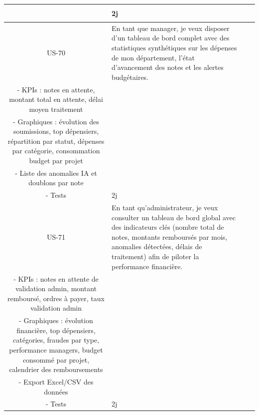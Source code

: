 \documentclass[12pt,a4paper]{report}
\begin{document}
\begin{longtable}{|c|p{5cm}|p{5.5cm}|c|}
\begin{tabular}[t]{@{}p{5.5cm}@{}}
\end{tabular} & 2j \\

\hline

US-70 & En tant que manager, je veux disposer d'un tableau de bord complet avec des statistiques synthétiques sur les dépenses de mon département, l'état d'avancement des notes et les alertes budgétaires. & 

\begin{tabular}[t]{@{}p{5.5cm}@{}}

- Composant \texttt{ManagerDashboard} \\

- KPIs : notes en attente, montant total en attente, délai moyen traitement \\

- Graphiques : évolution des soumissions, top dépensiers, répartition par statut, dépenses par catégorie, consommation budget par projet \\

- Liste des anomalies IA et doublons par note \\

- Tests

\end{tabular} & 2j \\

\hline

US-71 & En tant qu'administrateur, je veux consulter un tableau de bord global avec des indicateurs clés (nombre total de notes, montants remboursés par mois, anomalies détectées, délais de traitement) afin de piloter la performance financière. & 

\begin{tabular}[t]{@{}p{5.5cm}@{}}

- Composant \texttt{AdminDashboard} \\

- KPIs : notes en attente de validation admin, montant remboursé, ordres à payer, taux validation admin \\

- Graphiques : évolution financière, top dépensiers, catégories, fraudes par type, performance managers, budget consommé par projet, calendrier des remboursements \\

- Export Excel/CSV des données \\

- Tests

\end{tabular} & 2j \\


\end{longtable}
\end{document}
